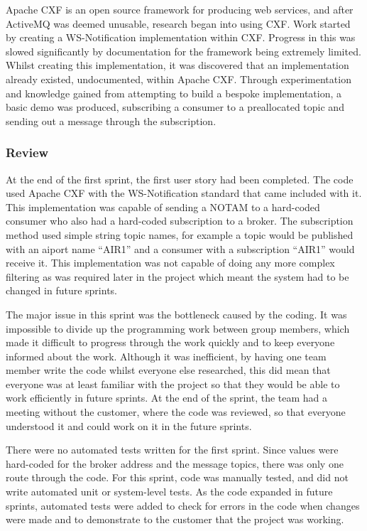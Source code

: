 \documentclass[a4paper, 12pt, twoside]{article}
\begin{document}
Apache CXF is an open source framework for producing web services, and after ActiveMQ was deemed unusable, research began into using CXF. Work started by creating a WS-Notification implementation within CXF. Progress in this was slowed significantly by documentation for the framework being extremely limited. Whilst creating this implementation, it was discovered that an implementation already existed, undocumented, within Apache CXF. Through experimentation and knowledge gained from attempting to build a bespoke implementation, a basic demo was produced, subscribing a consumer to a preallocated topic and sending out a message through the subscription.

\subsubsection{Review}

At the end of the first sprint, the first user story had been completed. The code used Apache CXF with the WS-Notification standard that came included with it. This implementation was capable of sending a NOTAM to a hard-coded consumer who also had a hard-coded subscription to a broker. The subscription method used simple string topic names, for example a topic would be published with an aiport name ``AIR1'' and a consumer with a subscription ``AIR1'' would receive it. This implementation was not capable of doing any more complex filtering as was required later in the project which meant the system had to be changed in future sprints.

The major issue in this sprint was the bottleneck caused by the coding. It was impossible to divide up the programming work between group members, which made it difficult to progress through the work quickly and to keep everyone informed about the work. Although it was inefficient, by having one team member write the code whilst everyone else researched, this did mean that everyone was at least familiar with the project so that they would be able to work efficiently in future sprints. At the end of the sprint, the team had a meeting without the customer, where the code was reviewed, so that everyone understood it and could work on it in the future sprints.

There were no automated tests written for the first sprint. Since values were hard-coded for the broker address and the message topics, there was only one route through the code. For this sprint, code was manually tested, and did not write automated unit or system-level tests. As the code expanded in future sprints, automated tests were added to check for errors in the code when changes were made and to demonstrate to the customer that the project was working.
\end{document}
